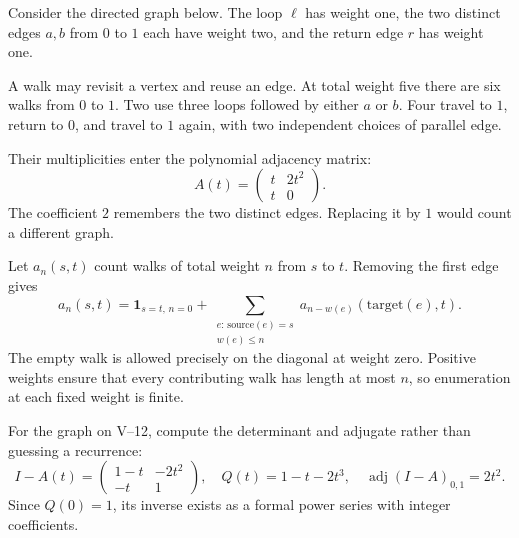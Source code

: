 
Consider the directed graph below. The loop $\ell$ has weight one, the two distinct edges $a,b$ from $0$ to $1$ each have weight two, and the return edge $r$ has weight one.


A walk may revisit a vertex and reuse an edge. At total weight five there are six walks from $0$ to $1$. Two use three loops followed by either $a$ or $b$. Four travel to $1$, return to $0$, and travel to $1$ again, with two independent choices of parallel edge.

Their multiplicities enter the polynomial adjacency matrix:
\[
A(t)=\begin{pmatrix}t&2t^2\\t&0\end{pmatrix}.
\]
The coefficient $2$ remembers the two distinct edges. Replacing it by $1$ would count a different graph.

Let $a_n(s,t)$ count walks of total weight $n$ from $s$ to $t$. Removing the first edge gives
\[
a_n(s,t)=\mathbf1_{s=t,\,n=0}
 +\sum_{\substack{e:\,\mathrm{source}(e)=s\\w(e)\le n}}
 a_{n-w(e)}(\mathrm{target}(e),t).
\]
The empty walk is allowed precisely on the diagonal at weight zero. Positive weights ensure that every contributing walk has length at most $n$, so enumeration at each fixed weight is finite.


For the graph on V--12, compute the determinant and adjugate rather than guessing a recurrence:
\[
I-A(t)=\begin{pmatrix}1-t&-2t^2\\-t&1\end{pmatrix},
\quad Q(t)=1-t-2t^3,
\quad \operatorname{adj}(I-A)_{0,1}=2t^2.
\]
Since $Q(0)=1$, its inverse exists as a formal power series with integer coefficients.

